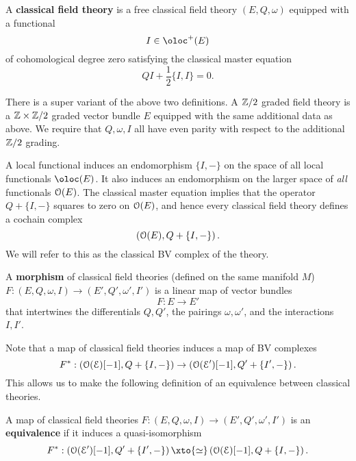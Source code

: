 \documentclass[10pt, oneside]{article}
\def\cE{\mathcal E}\def\cF{\mathcal F}\def\cG{\mathcal G}\def\cH{\mathcal H}
\begin{document}
\begin{dfn}
A {\bf classical field theory} is a free classical field theory $(E, Q, \omega)$ equipped with a functional
\[
I \in \oloc^+(E)
\]
of cohomological degree zero satisfying the classical master equation 
\[
Q I + \frac{1}{2} \{I,I\} = 0 .
\]
\end{dfn} 

\begin{remark}
There is a super variant of the above two definitions. 
A $\mathbb Z/2$ graded field theory is a $\mathbb Z \times \mathbb Z/2$ graded vector bundle $E$ equipped with the same additional data as above.
We require that $Q, \omega, I$ all have even parity with respect to the additional $\mathbb Z/2$ grading. 
\end{remark}

A local functional induces an endomorphism $\{I,-\}$ on the space of all local functionals $\oloc(E)$. 
It also induces an endomorphism on the larger space of {\em all} functionals $\mathcal O(E)$. 
The classical master equation implies that the operator $Q + \{I,-\}$ squares to zero on $\mathcal O(E)$, and hence every classical field theory defines a cochain complex
\[
\left(\mathcal O(E), Q + \{I,-\}\right) .
\]
We will refer to this as the classical BV complex of the theory. 

\begin{dfn}
A {\bf morphism} of classical field theories (defined on the same manifold $M$) $F : (E, Q, \omega, I) \to (E', Q', \omega', I')$ is a linear map of vector bundles
\[
F : E \to E'
\]
that intertwines the differentials $Q, Q'$, the pairings $\omega, \omega'$, and the interactions $I,I'$. 
\end{dfn}

Note that a map of classical field theories induces a map of BV complexes
\[
F^* : \left(\cO (\cE)[-1], Q + \{I,-\} \right) \to \left(\cO (\cE')[-1], Q' + \{I',-\} \right) .
\]
This allows us to make the following definition of an equivalence between classical theories. 

\begin{dfn}
A map of classical field theories $F : (E, Q, \omega, I) \to (E', Q', \omega', I')$ is an {\bf equivalence} if it induces a quasi-isomorphism 
\[
F^* :  \left(\cO(\cE')[-1], Q' + \{I',-\} \right) \xto{\simeq} \left(\cO(\cE)[-1], Q + \{I,-\} \right) .
\]
\end{dfn}


\end{document}
